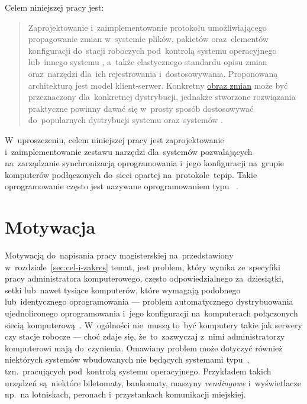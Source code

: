 \documentclass[thesis]{subfiles}
\begin{document}
\noindent Celem niniejszej pracy jest:
\blockcquote{formularz-zgloszenia-pracy}{Zaprojektowanie i~zaimplementowanie protokołu umożliwiającego propagowanie zmian w~systemie plików, pakietów oraz~elementów konfiguracji do~stacji roboczych pod~kontrolą systemu operacyjnego  lub~innego systemu , a~także elastycznego standardu opisu zmian oraz~narzędzi dla~ich rejestrowania i~dostosowywania. Proponowaną architekturą jest model klient-serwer. Konkretny \hyperref[sec:obraz-zmian-konfiguracji]{obraz zmian} może być przeznaczony dla~konkretnej dystrybucji, jednakże stworzone rozwiązania praktyczne powinny dawać się w~prosty sposób dostosowywać do~popularnych dystrybucji systemu  oraz~systemów .}
W~uproszczeniu, celem niniejszej pracy jest zaprojektowanie i~zaimplementowanie zestawu narzędzi dla~systemów  pozwalających na~zarządzanie synchronizacją oprogramowania i~jego konfiguracji na~grupie komputerów podłączonych do~sieci opartej na~protokole~\gls{tcpip}. Takie oprogramowanie często jest nazywane oprogramowaniem typu ~\cite{wiki:scm}.


\section{Motywacja}

Motywacją do~napisania pracy magisterskiej na~przedstawiony w~rozdziale~\ref{sec:cel-i-zakres} temat, jest problem, który wynika ze~specyfiki pracy administratora komputerowego, często odpowiedzialnego za~dziesiątki, setki lub~nawet tysiące komputerów, które wymagają podobnego lub~identycznego oprogramowania --- problem automatycznego dystrybuowania ujednoliconego oprogramowania i~jego konfiguracji na~komputerach połączonych siecią komputerową~\cite{so-problem-intro}. W~ogólności nie~muszą to~być komputery takie jak serwery czy stacje robocze --- choć zdaje się, że~to~zazwyczaj z~nimi administratorzy komputerowi mają do~czynienia. Omawiany problem może dotyczyć również niektórych systemów wbudowanych nie będących systemami typu~\mbox{}, tzn.~pracujących pod~kontrolą systemu operacyjnego. Przykładem takich urządzeń są~niektóre biletomaty, bankomaty, maszyny \emph{vendingowe} i~wyświetlacze np.~na lotniskach, peronach i~przystankach komunikacji miejskiej.
\end{document}
